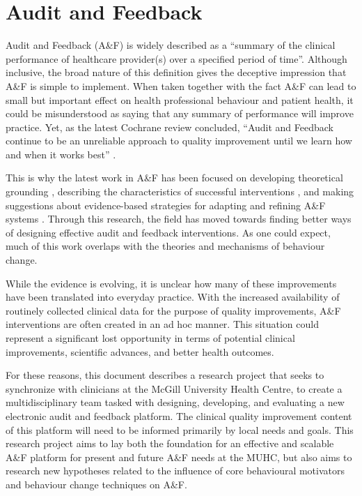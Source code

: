 \section{Audit and Feedback}
Audit and Feedback (A\&F) is widely described as a “summary of the clinical performance of healthcare provider(s) over a specified period of time”\cite{ivers2012audit}. Although inclusive, the broad nature of this definition gives the deceptive impression that A\&F is simple to implement. When taken together with the fact A\&F can lead to small but important effect on health professional behaviour and patient health\cite{ivers2012audit}, it could be misunderstood as saying that any summary of performance will improve practice. Yet, as the latest Cochrane review concluded, “Audit and Feedback continue to be an unreliable approach to quality improvement until we learn how and when it works best” \cite{foy2005we}.

This is why the latest work in A\&F has been focused on developing theoretical grounding \cite{hysong2017theory}\cite{brown2019clinical}\cite{landis2015computer}, describing the characteristics of successful interventions \cite{ivers2012audit}\cite{colquhoun2013systematic}\cite{tuti2017systematic}, and making suggestions about evidence-based strategies for adapting and refining A\&F systems \cite{brehaut2016practice}\cite{mcnamara2016confidential}. Through this research, the field has moved towards finding better ways of designing effective audit and feedback interventions. As one could expect, much of this work overlaps with the theories and mechanisms of behaviour change\cite{colquhoun2017advancing}.

While the evidence is evolving, it is unclear how many of these improvements have been translated into everyday practice. With the increased availability of routinely collected clinical data for the purpose of quality improvements, A\&F interventions are often created in an ad hoc manner. This situation could represent a significant lost opportunity in terms of potential clinical improvements, scientific advances, and better health outcomes.

For these reasons, this document describes a research project that seeks to synchronize with clinicians at the McGill University Health Centre, to create a multidisciplinary team tasked with designing, developing, and evaluating a new electronic audit and feedback platform. The clinical quality improvement content of this platform will need to be informed primarily by local needs and goals. This research project aims to lay both \cite{ivers2012audit} the foundation for an effective and scalable A\&F platform for present and future A\&F needs at the MUHC, but also \cite{foy2005we} aims to research new hypotheses related to the influence of core behavioural motivators and behaviour change techniques on A\&F.

